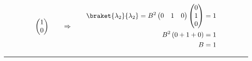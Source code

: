 \documentclass{article}
\begin{document}
\begin{enumerate}
\begin{equation*}
\begin{split}
{\begin{pmatrix}
						1 \\
						0
				\end{pmatrix}}
			\end{split}
			\qquad \Rightarrow \qquad
			\begin{split}
				\braket{\lambda_2}{\lambda_2} = B^2 \begin{pmatrix}
					0 & 1 & 0
				\end{pmatrix}
				\begin{pmatrix}
					0 \\
					1 \\
					0
				\end{pmatrix} &= 1 \\
				B^2 \left( 0 + 1 + 0 \right) &= 1 \\
				B &= 1
			\end{split}
		\end{equation*}
		
		\noindent\hfil\rule{0.5\textwidth}{.4pt}\hfil
		

\end{enumerate}
\end{document}

